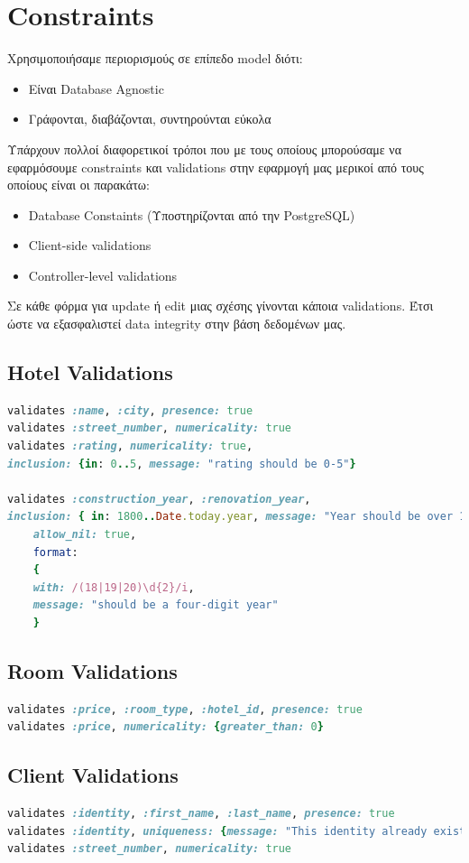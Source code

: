 \documentclass[a4paper,12pt]{article}
\begin{document}
\section{Constraints}
Χρησιμοποιήσαμε περιορισμούς σε επίπεδο model διότι:
\begin{itemize}
	\item Είναι Database Agnostic
	\item Γράφονται, διαβάζονται, συντηρούνται εύκολα
\end{itemize}
Υπάρχουν πολλοί διαφορετικοί τρόποι που με τους οποίους μπορούσαμε να εφαρμόσουμε constraints και validations στην εφαρμογή μας μερικοί από τους οποίους είναι οι παρακάτω:
\begin{itemize}
	\item Database Constaints (Υποστηρίζονται από την PostgreSQL)
	\item Client-side validations
	\item Controller-level validations
\end{itemize}

Σε κάθε φόρμα για update ή edit μιας σχέσης γίνονται κάποια validations. Έτσι ώστε να εξασφαλιστεί data integrity στην βάση δεδομένων μας.\\
\subsection{Hotel Validations}
	\begin{lstlisting}[language=Ruby]
validates :name, :city, presence: true
validates :street_number, numericality: true
validates :rating, numericality: true, 
inclusion: {in: 0..5, message: "rating should be 0-5"}

validates :construction_year, :renovation_year,
inclusion: { in: 1800..Date.today.year, message: "Year should be over 1800"},
 	allow_nil: true,
 	format: 
 	{ 
   	with: /(18|19|20)\d{2}/i, 
   	message: "should be a four-digit year"
 	}
	\end{lstlisting}

\subsection{Room Validations}
	\begin{lstlisting}[language=Ruby]
validates :price, :room_type, :hotel_id, presence: true
validates :price, numericality: {greater_than: 0}
	\end{lstlisting}
	
\subsection{Client Validations}
	\begin{lstlisting}[language=Ruby]
validates :identity, :first_name, :last_name, presence: true
validates :identity, uniqueness: {message: "This identity already exists. Identity must be unique!"}
validates :street_number, numericality: true
	\end{lstlisting}
	
\end{document}
